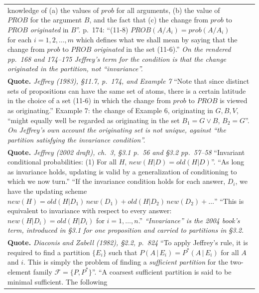 \documentclass[10pt]{article}
\theoremstyle{definition}
\newlength{\fullw}\setlength{\fullw}{25.9cm}
\begin{document}
{\begin{longtable}{|p{0.9cm}|p{12.2cm}|p{12.2cm}|}
{knowledge of (a) the values of $prob$ for all arguments, (b) the value of $PROB$ for the
argument $B$, and the fact that (c) the change from $prob$ to $PROB$ \textit{originated}
in $B$''. p.~174: ``(11-8) $PROB(A/A_i)=prob(A/A_i)$ for each $i=1,2,\ldots,m$ which defines
what we shall mean by saying that the change from $prob$ to $PROB$ \textit{originated} in
the set (11-6).'' \newline \textit{On the rendered pp.~168 and 174--175 Jeffrey's term for the condition is that the change originated in the partition, not ``invariance''.}} \\
\multicolumn{3}{|p{\fullw}|}{\textbf{Quote.} \textit{Jeffrey (1983), \S11.7, p.~174, and Example 7} \newline ``Note that since distinct sets of propositions can have the same set of atoms, there
is a certain latitude in the choice of a set (11-6) in which the change from $prob$ to
$PROB$ is viewed as originating.'' Example 7: the change of Example 6, originating in
$G,B,V$, ``might equally well be regarded as originating in the set $B_1=G\vee B$,
$B_2=G$''. \newline \textit{On Jeffrey's own account the originating set is not unique, against ``the partition satisfying the invariance condition''.}} \\
\multicolumn{3}{|p{\fullw}|}{\textbf{Quote.} \textit{Jeffrey (2002 draft), ch.~3, \S3.1 p.~56 and \S3.2 pp.~57--58} \newline ``Invariant conditional probabilities: (1) For all $H$, $new(H|D)=old(H|D)$''.
``As long as invariance holds, updating is valid by a generalization of conditioning to
which we now turn.'' ``If the invariance condition holds for each answer, $D_i$, we have the
updating scheme $new(H)=old(H|D_1)\,new(D_1)+old(H|D_2)\,new(D_2)+\ldots$'' ``This is
equivalent to invariance with respect to every answer: $new(H|D_i)=old(H|D_i)$ for
$i=1,\ldots,n$.'' \newline \textit{``Invariance'' is the 2004 book's term, introduced in \S3.1 for one proposition and carried to partitions in \S3.2.}} \\
\multicolumn{3}{|p{\fullw}|}{\textbf{Quote.} \textit{Diaconis and Zabell (1982), \S2.2, p.~824} \newline ``To apply Jeffrey's rule, it is required to find a partition $\{E_i\}$ such that
$P(A\,|\,E_i)=P^*(A\,|\,E_i)$ for all $A$ and $i$. This is simply the problem of finding a
\textit{sufficient partition} for the two-element family $\mathcal{F}=\{P,P^*\}$''.
``A coarsest sufficient partition is said to be minimal sufficient. The following
}
\end{longtable}}
\end{document}
